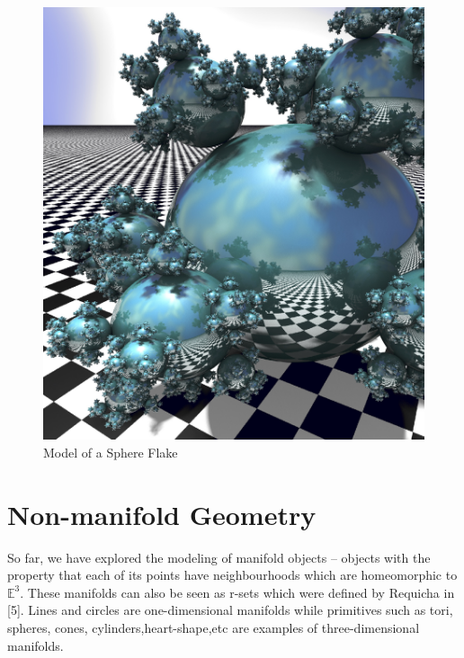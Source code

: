 \begin{figure}[htbp]
\centering
\includegraphics[trim=0.0cm 0.5cm 0.1cm 0.1cm, clip=true, totalheight=0.5\textheight]{Pictures/Sphere.png}
\caption[Model of a Sphere Flake]{Model of a Sphere Flake}
\label{Sphere}
\end{figure}

\clearpage

\section{Non-manifold Geometry}

\hspace{30} So   far,   we   have   explored   the   modeling   of   manifold   objects – objects   with  
the   property   that   each   of   its   points   have   neighbourhoods   which   are  
homeomorphic   to   $\mathbb{E}^3$.   These   manifolds   can  also   be   seen   as   
r-­sets   which   were   defined   by   Requicha   in   [5].   Lines   and   circles  are   
one-­dimensional   manifolds   while   primitives   such   as   tori,   spheres,   cones, 
cylinders,heart­-shape,etc are examples of three­-dimensional manifolds.

